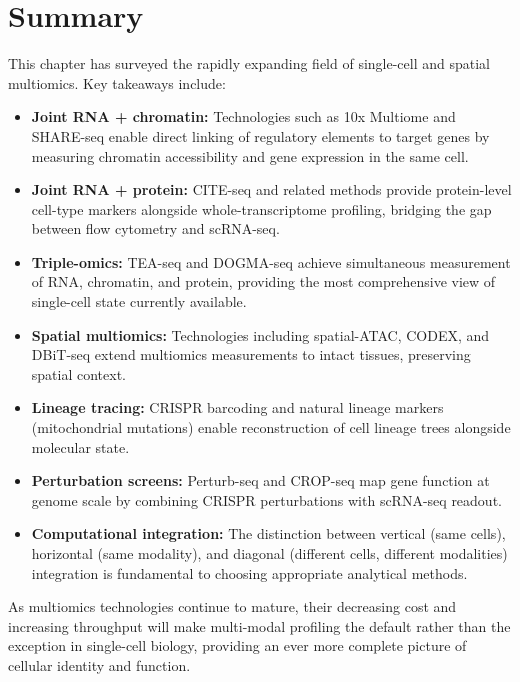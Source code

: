 \section{Summary}
\label{sec:multiomics:summary}

This chapter has surveyed the rapidly expanding field of single-cell and spatial multiomics. Key takeaways include:

\begin{itemize}[itemsep=3pt]
  \item \textbf{Joint RNA + chromatin:} Technologies such as 10x Multiome and SHARE-seq enable direct linking of regulatory elements to target genes by measuring chromatin accessibility and gene expression in the same cell.
  \item \textbf{Joint RNA + protein:} CITE-seq and related methods provide protein-level cell-type markers alongside whole-transcriptome profiling, bridging the gap between flow cytometry and scRNA-seq.
  \item \textbf{Triple-omics:} TEA-seq and DOGMA-seq achieve simultaneous measurement of RNA, chromatin, and protein, providing the most comprehensive view of single-cell state currently available.
  \item \textbf{Spatial multiomics:} Technologies including spatial-ATAC, CODEX, and DBiT-seq extend multiomics measurements to intact tissues, preserving spatial context.
  \item \textbf{Lineage tracing:} CRISPR barcoding and natural lineage markers (mitochondrial mutations) enable reconstruction of cell lineage trees alongside molecular state.
  \item \textbf{Perturbation screens:} Perturb-seq and CROP-seq map gene function at genome scale by combining CRISPR perturbations with scRNA-seq readout.
  \item \textbf{Computational integration:} The distinction between vertical (same cells), horizontal (same modality), and diagonal (different cells, different modalities) integration is fundamental to choosing appropriate analytical methods.
\end{itemize}

As multiomics technologies continue to mature, their decreasing cost and increasing throughput will make multi-modal profiling the default rather than the exception in single-cell biology, providing an ever more complete picture of cellular identity and function.
